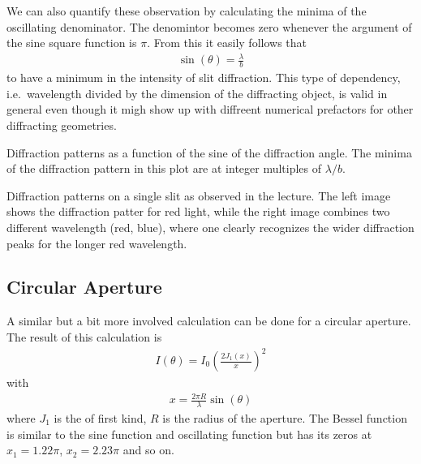 \documentclass[letterpaper,10pt,english]{sphinxmanual}
\let\sphinxpxdimen\pdfpxdimen\else\newdimen\sphinxpxdimen
\begin{document}
We can also quantify these observation by calculating the minima of the oscillating denominator. The denomintor becomes zero whenever the argument of the sine square function is \(\pi\). From this it easily follows that
\begin{equation*}
\begin{split}\sin(\theta)=\frac{\lambda}{b}\end{split}
\end{equation*}
to have a minimum in the intensity of slit diffraction. This type of dependency, i.e. wavelength divided by the dimension of the diffracting object, is valid in general even though it migh show up with diffreent numerical prefactors for other diffracting geometries.



\sphinxincludegraphics[width=600\sphinxpxdimen]{{slit_diff_min}.png}



 Diffraction patterns as a function of the sine of the diffraction angle. The minima of the diffraction pattern in this plot are at integer multiples of \(\lambda/b\).







 



 Diffraction patterns on a single slit as observed in the lecture. The left image shows the diffraction patter for red light, while the right image combines two different wavelength (red, blue), where one clearly recognizes the wider diffraction peaks for the longer red wavelength.






\subsection{Circular Aperture}
\label{\detokenize{notebooks/L12/Diffraction:Circular-Aperture}}
A similar but a bit more involved calculation can be done for a circular aperture. The result of this calculation is
\begin{equation*}
\begin{split}I(\theta)=I_0\left( \frac{2J_1(x)}{x} \right )^2\end{split}
\end{equation*}
with
\begin{equation*}
\begin{split}x=\frac{2\pi R}{\lambda}\sin(\theta)\end{split}
\end{equation*}
where \(J_1\) is the  of first kind, \(R\) is the radius of the aperture. The Bessel function is similar to the sine function and oscillating function but has its zeros at \(x_1=1.22 \pi\), \(x_2=2.23 \pi\) and so on.
\end{document}
